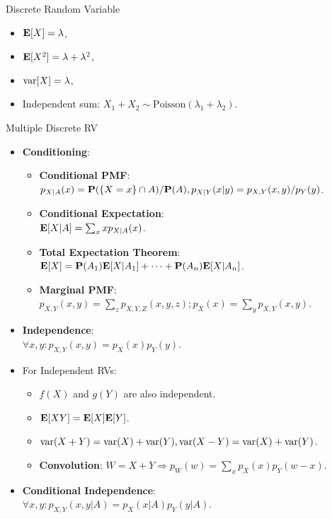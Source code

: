 \documentclass[landscape,a4paper]{article}
\begin{document}
\begin{cheatsheetcolumns}
\begin{card}{Discrete Random Variable}
\begin{itemize}
\begin{itemize}
\begin{itemize}
						\item $\mathbf{E}[X]=\lambda$,
						\item $\mathbf{E}[X^2]=\lambda+\lambda^2$,
						\item $\operatorname{var}[X]=\lambda$,
						\item Independent sum: $X_1+X_2\sim\text{Poisson}(\lambda_1+\lambda_2)$.
					\end{itemize}
				\end{itemize}
				\end{itemize}
			\end{card}
			\begin{card}{Multiple Discrete RV}
				\begin{itemize}
					\item \textbf{Conditioning}:
					\begin{itemize}
						\item \textbf{Conditional PMF}:\\ $p_{X|A}(x)=\mathbf{P}(\{X=x\}\cap A)/\mathbf{P}(A),p_{X|Y}(x|y)=p_{X,Y}(x,y)/p_Y(y)$.
						\item \textbf{Conditional Expectation}:\\ $\mathbf{E}[X|A]=\sum_x xp_{X|A}(x)$.
						\item \textbf{Total Expectation Theorem}:\\ $\mathbf{E}[X]=\mathbf{P}(A_1)\mathbf{E}[X|A_1]+\dots +\mathbf{P}(A_n)\mathbf{E}[X|A_n]$.
						\item \textbf{Marginal PMF}:\\ $p_{X,Y}(x,y)=\sum_z p_{X,Y,Z}(x,y,z);p_X(x)=\sum_y p_{X,Y}(x,y)$.
					\end{itemize}
					\item \textbf{Independence}:\\ $\forall x,y\colon p_{X,Y}(x,y)=p_X(x)p_Y(y)$.
					\item For Independent RVs:
					\begin{itemize}
						\item $f(X)$ and $g(Y)$ are also independent.
						\item $\mathbf{E}[XY]=\mathbf{E}[X]\mathbf{E}[Y]$.
						\item $\operatorname{var}(X+Y)=\operatorname{var}(X)+\operatorname{var}(Y), \operatorname{var}(X-Y)=\operatorname{var}(X)+\operatorname{var}(Y)$.
						\item \textbf{Convolution}: $W=X+Y\Rightarrow p_W(w)=\sum_xp_X(x)p_Y(w-x)$.
					\end{itemize}
					\item \textbf{Conditional Independence}:\\ $\forall x,y\colon p_{X,Y}(x,y|A)=p_X(x|A)p_Y(y|A)$.
				\end{itemize}

\end{card}
\end{cheatsheetcolumns}
\end{document}

